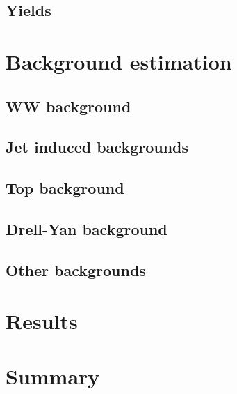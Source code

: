 \documentclass{cmspaper}
\begin{document}
  \subsection{Yields}
    \label{sec:yields}
%    

\section{Background estimation}
    \label{sec:bkg_intro}
%    
  \subsection{WW background}
    \label{sec:bkg_ww}
%    
  \subsection{Jet induced backgrounds}
    \label{sec:bkg_fakes}
%    
  \subsection{Top background}
    \label{sec:bkg_top}
%    
  \subsection{Drell-Yan background}
    \label{sec:bkg_dy}
%    
  \subsection{Other backgrounds}
    \label{sec:bkg_other}
%    

\section{Results}
    \label{sec:results}
%    

\section{Summary}
    \label{sec:summary}
%    

\clearpage
\end{document}
